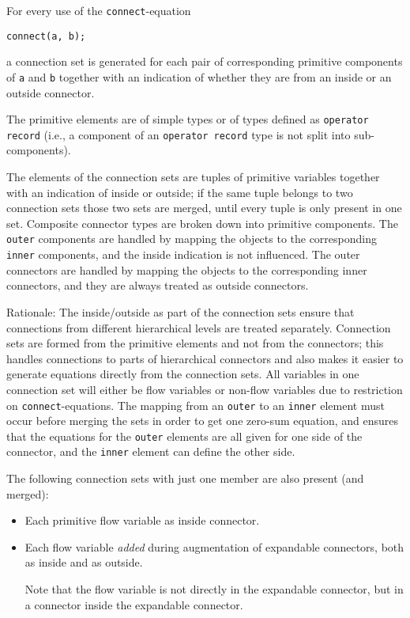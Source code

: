 For every use of the \lstinline!connect!-equation
\begin{lstlisting}[language=modelica]
connect(a, b);
\end{lstlisting}
a connection set is generated for each pair of corresponding primitive components of \lstinline!a! and \lstinline!b! together with an indication of whether they are from an inside or an outside connector.
\begin{definition}\label{primitive-elements}
The primitive elements are of simple types or of types defined as \lstinline!operator record! (i.e., a component of an \lstinline!operator record! type is not split into sub-components).
\end{definition}
The elements of the connection sets are tuples of primitive variables together with an indication of inside or outside; if the same tuple belongs to two connection sets those two sets are merged, until every tuple is only present in one set.
Composite connector types are broken down into primitive components.
The \lstinline!outer! components are handled by mapping the objects to the corresponding \lstinline!inner! components, and the inside indication is not influenced.
The outer connectors are handled by mapping the objects to the corresponding inner connectors, and they are always treated as outside connectors.

\begin{nonnormative}
Rationale: The inside/outside as part of the connection sets ensure that connections from different hierarchical levels are treated separately.
Connection sets are formed from the primitive elements and not from the connectors; this handles connections to parts of hierarchical connectors and also makes it easier to generate equations directly from the connection sets.
All variables in one connection set will either be flow variables or non-flow variables due to restriction on \lstinline!connect!-equations.
The mapping from an \lstinline!outer! to an \lstinline!inner! element must occur before merging the sets in order to get one zero-sum equation, and ensures that the equations for the \lstinline!outer! elements are all given for one side of the connector, and the \lstinline!inner! element can define the other side.
\end{nonnormative}

The following connection sets with just one member are also present (and merged):
\begin{itemize}
\item
  Each primitive flow variable as inside connector.
\item
  Each flow variable \emph{added} during augmentation of expandable connectors, both as inside and as outside.
  \begin{nonnormative}
  Note that the flow variable is not directly in the expandable connector, but in a connector inside the expandable connector.
  \end{nonnormative}
\end{itemize}


